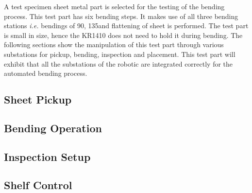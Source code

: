 A test specimen sheet metal part is selected for the testing of the bending process. This test part has six bending steps. It makes use of all three bending stations \textit{i.e.} bendings of 90\textdegree, 135\textdegree and flattening of sheet is performed. The test part is small in size, hence the KR1410 does not need to hold it during bending. The following sections show the manipulation of this test part through various substations for pickup, bending, inspection and placement. This test part will exhibit that all the substations of the robotic are integrated correctly for the automated bending process.

\subsection{Sheet Pickup}
\label{subsec:sheet-pickup}

\FloatBarrier  %

\subsection{Bending Operation}
\label{subsec:bending-operation}

\FloatBarrier  %

\subsection{Inspection Setup}
\label{subsec:inspection}

\FloatBarrier  %

\subsection{Shelf Control}
\label{subsec:shelf-control}

\FloatBarrier  %
